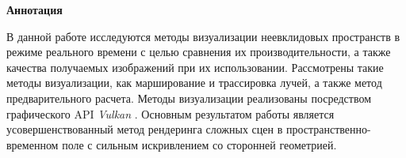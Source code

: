 \renewcommand{\abstractnamefont}{\normalfont\Large\bfseries}
\renewcommand{\abstracttextfont}{\normalfont\Huge}

\begin{center}
    \textbf{Аннотация}
\end{center}

В данной работе исследуются методы визуализации неевклидовых пространств в режиме реального времени с целью сравнения их производительности, а также качества получаемых изображений при их использовании. Рассмотрены такие методы визуализации, как марширование и трассировка лучей, а также метод предварительного расчета. Методы визуализации реализованы посредством графического API \textit{Vulkan} \cite{vulkan}. Основным результатом работы является усовершенствованный метод рендеринга сложных сцен в пространственно-временном поле с сильным искривлением со сторонней геометрией.
\vfill

\newpage